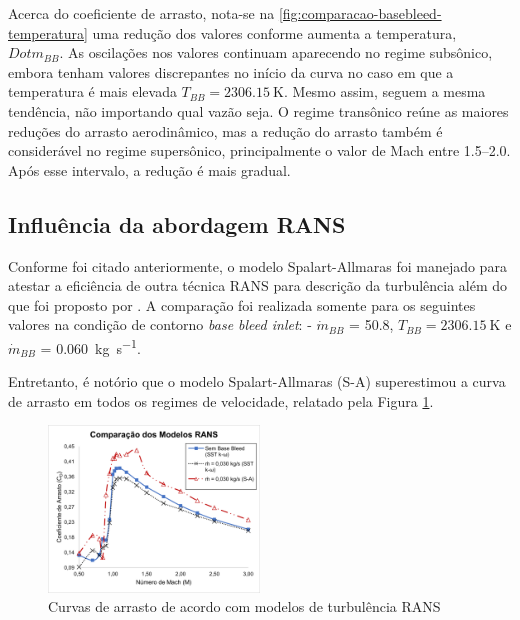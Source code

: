 Acerca do coeficiente de arrasto, nota-se na \autoref{fig:comparacao-basebleed-temperatura} uma redução dos valores conforme aumenta a temperatura, \(Dot{m}_{BB}\). As oscilações nos valores continuam aparecendo no regime subsônico, embora tenham valores discrepantes no início da curva no caso em que a temperatura é mais elevada \(T_{BB} = \qty{2306,15}{\kelvin}\). Mesmo assim, seguem a mesma tendência, não importando qual vazão seja. O regime transônico reúne as maiores reduções do arrasto aerodinâmico, mas a redução do arrasto também é considerável no regime supersônico, principalmente o valor de Mach entre \numrange{1,5}{2,0}. Após esse intervalo, a redução é mais gradual.

\subsection{Influência da abordagem RANS}\label{subsec:resultados-com-basebleed-RANS}

Conforme foi citado anteriormente, o modelo Spalart-Allmaras \cite{Spalart1992} foi manejado para atestar a eficiência de outra técnica RANS para descrição da turbulência além do que foi proposto por \citeauthor{Menter1994TwoequationET}. A comparação foi realizada somente para os seguintes valores na condição de contorno \textit{base bleed inlet}: - \(\Dot{m}_{BB}\) = \qty{50,8}{\millimetre}, \(T_{BB} = \qty{2306,15}{\kelvin}\) e \(\Dot{m}_{BB}\) = \qty{0,060}{\kilogram\per\second}.

Entretanto, é notório que o modelo Spalart-Allmaras (S-A) superestimou a curva de arrasto em todos os regimes de velocidade, relatado pela Figura \ref{fig:comparacao-bb-rans}.

\begin{figure}[!ht]
    \centering
    \includegraphics[width=0.5\textwidth]{cd-combasebleed-rans.png}
 	\caption{Curvas de arrasto de acordo com modelos de turbulência RANS}
    \label{fig:comparacao-bb-rans}
\end{figure}


